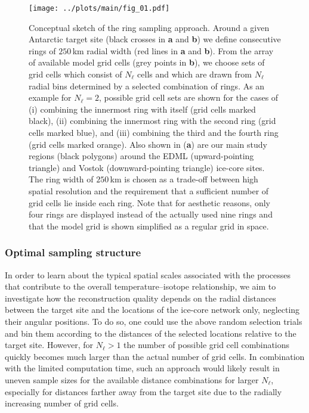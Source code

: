 \documentclass[cp]{copernicus}
\begin{document}
\begin{figure*}[t]%
\centering
\texttt{[image: ../plots/main/fig\_01.pdf]}
\caption[Conceptual approach]{%
  Conceptual sketch of the ring sampling approach. Around a given Antarctic
  target site (black crosses in \textbf{a} and \textbf{b}) we define
  consecutive rings of $250$\,km radial width (red lines in \textbf{a} and
  \textbf{b}). From the array of available model grid cells (grey points in
  \textbf{b}), we choose sets of grid cells which consist of $N_{\ell}$ cells
  and which are drawn from $N_{\ell}$ radial bins determined by a selected
  combination of rings. As an example for $N_{\ell}=2$, possible grid cell sets
  are shown for the cases of (i) combining the innermost ring with itself (grid
  cells marked black), (ii) combining the innermost ring with the second ring
  (grid cells marked blue), and (iii) combining the third and the fourth ring
  (grid cells marked orange). Also shown in (\textbf{a}) are our main study
  regions (black polygons) around the EDML (upward-pointing triangle) and Vostok
  (downward-pointing triangle) ice-core sites. The ring width of $250$\,km is
  chosen as a trade-off between high spatial resolution and the requirement that
  a sufficient number of grid cells lie inside each ring. Note that for
  aesthetic reasons, only four rings are displayed instead of the actually used
  nine rings and that the model grid is shown simplified as a regular grid in
  space.}
\label{fig:concept}%
\end{figure*}%

\subsubsection*{Optimal sampling structure}

In order to learn about the typical spatial scales associated with the processes
that contribute to the overall temperature--isotope relationship, we aim to
investigate how the reconstruction quality depends on the radial distances
between the target site and the locations of the ice-core network only,
neglecting their angular positions. To do so, one could use the above random
selection trials and bin them according to the distances of the selected
locations relative to the target site. However, for $N_{\ell}>1$ the number of
possible grid cell combinations quickly becomes much larger than the actual
number of grid cells. In combination with the limited computation time, such an
approach would likely result in uneven sample sizes for the available distance
combinations for larger $N_{\ell}$, especially for distances farther away from
the target site due to the radially increasing number of grid cells.
\end{document}

